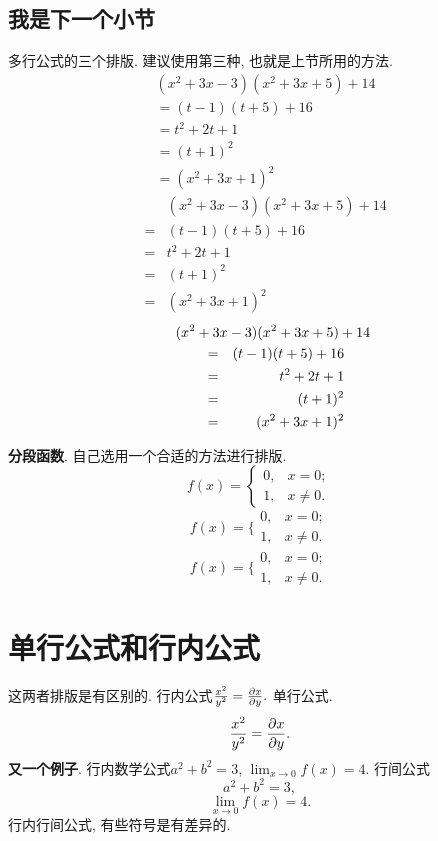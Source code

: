 \documentclass[a4paper,12pt,twoside]{ctexart}
\begin{document}
    \subsection{我是下一个小节} 多行公式的三个排版. 建议使用第三种, 也就是上节所用的方法.
        \begin{align*}
        &(x^{2}+3x-3)(x^{2}+3x+5)+14\\
        &=(t-1)(t+5)+16\\
        &=t^{2}+2t+1\\
        &=(t+1)^{2}\\
        &=(x^{2}+3x+1)^{2}
        \end{align*}
        \begin{eqnarray*}
        &&(x^{2}+3x-3)(x^{2}+3x+5)+14\\
        &=&(t-1)(t+5)+16\\
        &=&t^{2}+2t+1\\
        &=&(t+1)^{2}\\
        &=&(x^{2}+3x+1)^{2}
        \end{eqnarray*}
        \begin{eqnarray*}
        \lefteqn{(x^{2}+3x-3)(x^{2}+3x+5)+14}\qquad\\
        &=&(t-1)(t+5)+16\\
        &=&t^{2}+2t+1\\
        &=&(t+1)^{2}\\
        &=&(x^{2}+3x+1)^{2}
        \end{eqnarray*}

    \textbf{分段函数}. 自己选用一个合适的方法进行排版.
        $$f(x)=\begin{cases}
            0,&x=0;\\
            1,&x\ne0.
        \end{cases}$$
        $$
        f(x)=\bigg\{
            \begin{array}{ll}
            0,&x=0;\\
            1,&x\ne0.
            \end{array}
        $$
        $$
        f(x)=\bigg\{\!\!\!
            \begin{array}{ll}
            0,&x=0;\\[-15pt]
            1,&x\ne0.
            \end{array}
        $$

\section{单行公式和行内公式}
    这两者排版是有区别的. 行内公式$\frac{x^2}{y^2}=\frac{\partial x}{\partial y}.$  单行公式.  $$\frac{x^2}{y^2}=\frac{\partial x}{\partial y}.$$
    \textbf{又一个例子}. 行内数学公式$a^2+b^2=3$, $\lim_{x\to0}f(x)=4.$
    行间公式
        $$a^2+b^2=3,$$
        $$\lim_{x\to0}f(x)=4.$$
    行内行间公式, 有些符号是有差异的.
\end{document}
